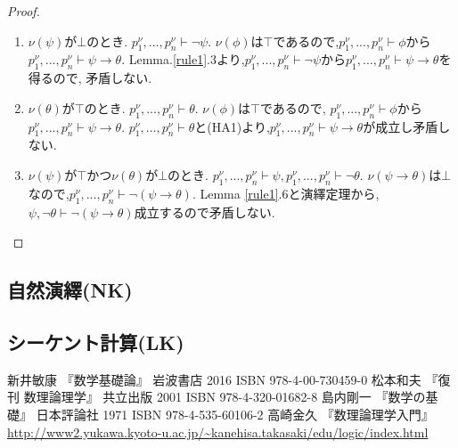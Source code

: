 \begin{proof}
\begin{enumerate}
\begin{enumerate}
\begin{enumerate}
				\item $\nu(\psi)$が$\bot$のとき. $p_1^{\nu},...,p_n^{\nu} \vdash \lnot \psi$.
					  $\nu(\phi)$は$\top$であるので,$p_1^{\nu},...,p_n^{\nu} \vdash \phi$から$p_1^{\nu},...,p_n^{\nu} \vdash \psi \to \theta$.
					  Lemma.\ref{rule1}.3より,$p_1^{\nu},...,p_n^{\nu} \vdash \lnot \psi$から$p_1^{\nu},...,p_n^{\nu} \vdash \psi \to \theta$を得るので,
					  矛盾しない.
				\item $\nu(\theta)$が$\top$のとき. $p_1^{\nu},...,p_n^{\nu} \vdash \theta$. $\nu(\phi)$は$\top$であるので,
					  $p_1^{\nu},...,p_n^{\nu} \vdash \phi$から$p_1^{\nu},...,p_n^{\nu} \vdash \psi \to \theta$.
					  $p_1^{\nu},...,p_n^{\nu} \vdash \theta$と(HA1)より,$p_1^{\nu},...,p_n^{\nu} \vdash \psi \to \theta$が成立し矛盾しない.
				\item $\nu(\psi)$が$\top$かつ$\nu(\theta)$が$\bot$のとき. $p_1^{\nu},...,p_n^{\nu} \vdash \psi, p_1^{\nu},...,p_n^{\nu} \vdash \lnot \theta$.
					  $\nu(\psi \to \theta)$は$\bot$なので,$p_1^{\nu},...,p_n^{\nu} \vdash \lnot (\psi \to \theta)$.
Lemma \ref{rule1}.6と演繹定理から,$\psi,\lnot \theta \vdash \lnot (\psi \to \theta)$成立するので矛盾しない.
			   \end{enumerate}
		\end{enumerate}
 \end{enumerate}
\end{proof}

\subsection{自然演繹(NK)}

\subsection{シーケント計算(LK)}

\begin{thebibliography}{9}
		新井敏康 『数学基礎論』 岩波書店 2016 ISBN 978-4-00-730459-0
		松本和夫 『復刊 数理論理学』 共立出版 2001 ISBN 978-4-320-01682-8
		島内剛一 『数学の基礎』 日本評論社 1971 ISBN 978-4-535-60106-2
		高崎金久 『数理論理学入門』 \url{http://www2.yukawa.kyoto-u.ac.jp/~kanehisa.takasaki/edu/logic/index.html}
\end{thebibliography}
